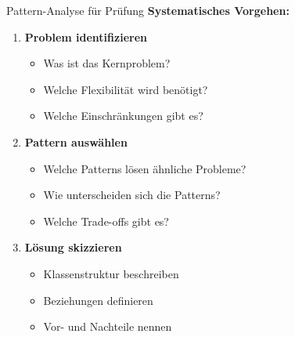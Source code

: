 \begin{KR}{Pattern-Analyse für Prüfung}
\textbf{Systematisches Vorgehen:}
\begin{enumerate}
    \item \textbf{Problem identifizieren}
    \begin{itemize}
        \item Was ist das Kernproblem?
        \item Welche Flexibilität wird benötigt?
        \item Welche Einschränkungen gibt es?
    \end{itemize}
    
    \item \textbf{Pattern auswählen}
    \begin{itemize}
        \item Welche Patterns lösen ähnliche Probleme?
        \item Wie unterscheiden sich die Patterns?
        \item Welche Trade-offs gibt es?
    \end{itemize}
    
    \item \textbf{Lösung skizzieren}
    \begin{itemize}
        \item Klassenstruktur beschreiben
        \item Beziehungen definieren
        \item Vor- und Nachteile nennen
    \end{itemize}
\end{enumerate}
\end{KR}

